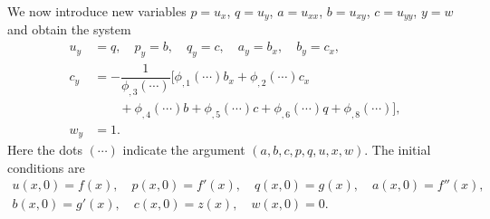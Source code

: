 \begin{Example}
We now introduce new variables $p=u_x$, $q=u_y$, $a=u_{xx}$, $b=u_{xy}$, $c=u_{yy}$, $y=w$ and obtain the system
\begin{equation}\label{eq:first-order-scalar-nonlinear-system}
\begin{aligned}
u_y&=q,\quad p_y=b,\quad q_y=c,\quad a_y=b_x,\quad b_y=c_x,\\
c_y&=-\dfrac1{\phi_{,3}(\cdots)}
\bigl[\phi_{,1}(\cdots)b_x+\phi_{,2}(\cdots)c_x\\
&\qquad+\phi_{,4}(\cdots)b+\phi_{,5}(\cdots)c+\phi_{,6}(\cdots)q+\phi_{,8}(\cdots)\bigr],\\
w_y&=1.
\end{aligned}
\end{equation}
Here the dots $(\cdots)$ indicate the argument $(a,b,c,p,q,u,x,w)$. The initial conditions are
\begin{equation}\label{eq:first-order-scalar-nonlinear-initial-data}
\begin{gathered}
u(x,0)=f(x),\quad p(x,0)=f'(x),\quad q(x,0)=g(x),\quad a(x,0)=f''(x),\\
b(x,0)=g'(x),\quad c(x,0)=z(x),\quad w(x,0)=0.
\end{gathered}
\end{equation}
\end{Example}

